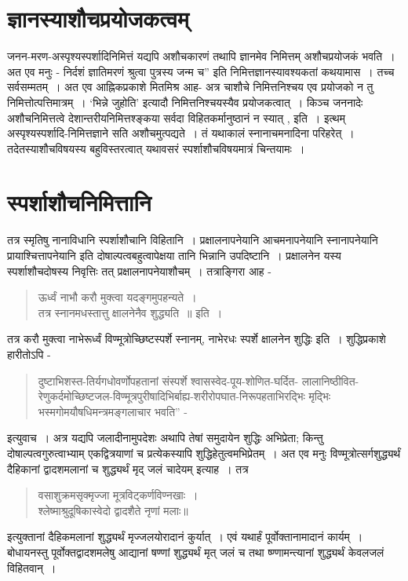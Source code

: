 {\section{ज्ञानस्याशौचप्रयोजकत्वम्}  

जनन-मरण-अस्पृश्यस्पर्शादिनिमित्तं यद्यपि अशौचकारणं तथापि ज्ञानमेव निमित्तम् अशौचप्रयोजकं भवति~। अत एव मनुः - निर्दशं ज्ञातिमरणं श्रुत्वा पुत्रस्य जन्म च” इति निमित्तज्ञानस्यावश्यकतां कथयामास~। तच्च सर्वसम्मतम्~। अत एव आह्निकप्रकाशे मितमिश्र आह- अत्र चाशौचे निमित्तनिश्चय एव प्रयोजको न तु निमित्तोत्पत्तिमात्रम्~। ‘भिन्ने जुहोति’ इत्यादौ निमित्तनिश्चयस्यैव प्रयोजकत्वात्~। किञ्च जननादेः अशौचनिमित्तत्वे देशान्तरीयनिमित्तश्ङ्कया सर्वदा विहितकर्मानुष्ठानं न स्यात् , इति~। इत्थम् अस्पृश्यस्पर्शादि-निमित्तज्ञाने सति अशौचमुत्पद्यते~। तं यथाकालं स्नानाचमनादिना परिहरेत्~। तदेतस्याशौचविषयस्य बहुविस्तरत्वात् यथावसरं स्पर्शाशौचविषयमात्रं चिन्तयामः~। 

\section*{स्पर्शाशौचनिमित्तानि}

तत्र स्मृतिषु नानाविधानि स्पर्शाशौचानि विहितानि~। प्रक्षालनापनेयानि आचमनापनेयानि स्नानापनेयानि प्रायाश्चित्तापनेयानि इति दोषाल्पत्वबहुत्वापेक्षया तानि भिन्नानि उपदिष्टानि~। प्रक्षालनेन यस्य स्पर्शाशौचदोषस्य निवृत्तिः तत् प्रक्षालनापनेयाशौचम्~। तत्राङ्गिरा आह -
\begin{verse}
ऊर्ध्वं नाभौ करौ मुक्त्वा यदङ्गमुपहन्यते~। \\
तत्र स्नानमधस्तात्तु क्षालनेनैव शुद्ध्यति~॥ इति~। 
\end{verse}
तत्र करौ मुक्त्वा नाभेरूर्ध्वं विण्मूत्रोच्छिष्टस्पर्शे स्नानम्, नाभेरधः स्पर्शे क्षालनेन शुद्धिः इति~। शुद्धिप्रकाशे हारीतोऽपि - 
\begin{quote}
दुष्टाभिशस्त-तिर्यगधोवर्णोपहतानां संस्पर्शे श्वासस्वेद-पूय-शोणित-घर्दित- लालानिष्ठीवित-रेणुकर्दमोच्छिष्टजल-विण्मूत्रपुरीषादिभिर्बाह्य-शरीरोपघात-निरूपहताभिरद्भिः मृद्भिः भस्मगोमयौषधिमन्त्रमङ्गलाचार भवति” -
\end{quote}
इत्युवाच~। अत्र यद्यपि जलादीनामुपदेशः अथापि तेषां समुदायेन शुद्धिः अभिप्रेता; किन्तु दोषाल्पत्वगुरुत्वाभ्याम् एकद्वित्रयाणां च प्रत्येकस्यापि शुद्धिहेतुत्वमभिप्रेतम्~। अत एव मनुः विण्मूत्रोत्सर्गशुद्ध्यर्थं दैहिकानां द्वादशमलानां च शुद्ध्यर्थं मृद् जलं चादेयम् इत्याह~। तत्र 
\begin{verse}
वसाशुक्रमसृक्मृज्जा मूत्रविट्कर्णविण्नखाः~। \\
श्लेष्माश्रुदूषिकास्वेदो द्वादशैते नृणां मलाः॥
\end{verse}
इत्युक्तानां दैहिकमलानां शुद्ध्यर्थं मृज्जलयोरादानं कुर्यात्~। एवं यथार्हं पूर्वोक्तानामादानं कार्यम्~। बोधायनस्तु पूर्वोक्तद्वादशमलेषु आद्यानां षण्णां शुद्ध्यर्थं मृत् जलं च तथा ष्ण्णामन्त्यानां शुद्ध्यर्थं केवलजलं विहितवान्~। 

}
